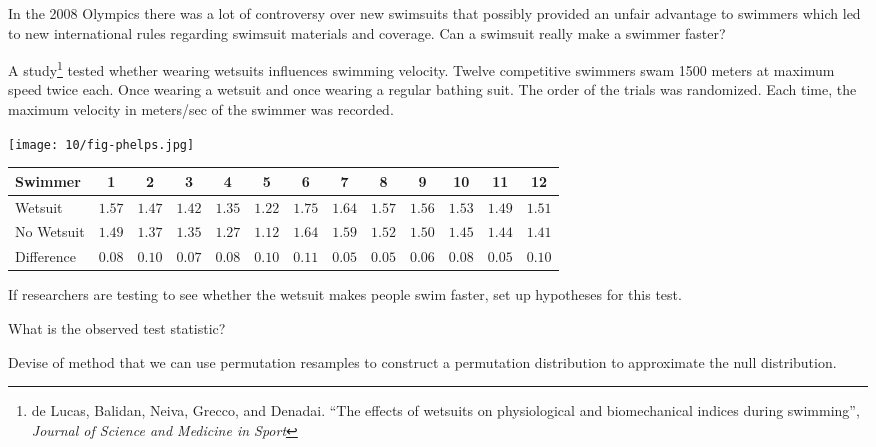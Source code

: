 
\begin{multicols}{2}

In the 2008 Olympics there was a lot of controversy over new swimsuits that possibly provided an unfair advantage to swimmers
which led to new international rules regarding swimsuit materials and coverage. Can a swimsuit really make a swimmer faster?

\medskip

A study\footnote{de Lucas, Balidan, Neiva, Grecco, and Denadai. ``The effects of wetsuits on physiological and biomechanical indices during swimming'', \textit{Journal of Science and Medicine in Sport}} tested whether wearing wetsuits influences swimming velocity. Twelve competitive swimmers swam 1500 meters at maximum speed twice each. Once wearing a wetsuit and once wearing a regular bathing suit. The order of the trials was randomized. Each time, the maximum velocity in meters/sec of the swimmer was recorded.

\columnbreak

\texttt{[image: 10/fig-phelps.jpg]}

\end{multicols}

\vspace{0.5in}

\begin{tabular}{|l||c|c|c|c|c|c|c|c|c|c|c|c|}
Swimmer & 1 & 2 & 3 & 4 & 5 & 6 & 7 & 8 & 9 & 10 & 11 & 12 \\
\hline
Wetsuit & $1.57$ & $1.47$ & $1.42$ & $1.35$ & $1.22$ & $1.75$ & $1.64$ & $1.57$ & $1.56$ & $1.53$ & $1.49$ & $1.51$ \\
No Wetsuit & $1.49$ & $1.37$ & $1.35$ & $1.27$ & $1.12$ & $1.64$ & $1.59$ & $1.52$ & $1.50$ & $1.45$ & $1.44$ & $1.41$ \\
\hline
Difference & $0.08$ &  $0.10$ &  $0.07$ &  $0.08$ &  $0.10$ & $0.11$ & $0.05$ & $0.05$ & $0.06$ & $0.08$ & $0.05$ &  $0.10$
\end{tabular}


\bb[resume]
\ii If researchers are testing to see whether the wetsuit makes people swim faster, set up hypotheses for this test. \vfill

\ii What is the observed test statistic? \vfill

\ii Devise of method that we can use permutation resamples to construct a permutation distribution to approximate the null distribution.\ee

\vfill

